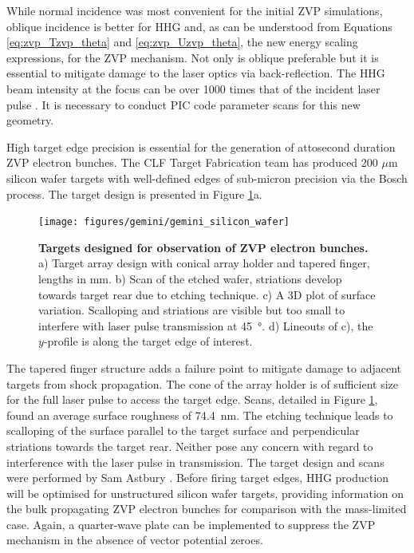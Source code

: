 While normal incidence was most convenient for the initial ZVP simulations, oblique incidence is better for \ac{HHG} \cite{gonoskovUltrarelativisticNanoplasmonicsRoute2011, edwardsXRayEmissionEffectiveness2020} and, as can be understood from Equations \ref{eq:zvp_Tzvp_theta} and \ref{eq:zvp_Uzvp_theta}, the new energy scaling expressions, for the ZVP mechanism. Not only is oblique preferable but it is essential to mitigate damage to the laser optics via back-reflection. The \ac{HHG} beam intensity at the focus can be over 1000 times that of the incident laser pulse \cite{quereReflectingPetawattLasers2021}. It is necessary to conduct PIC code parameter scans for this new geometry.

High target edge precision is essential for the generation of attosecond duration ZVP electron bunches. The CLF Target Fabrication team has produced 200 $\mu$m silicon wafer targets with well-defined edges of sub-micron precision via the Bosch process. The target design is presented in Figure \ref{fig:geminisiliconwafer}a.
\begin{figure}
	\centering
	\texttt{[image: figures/gemini/gemini\_silicon\_wafer]}
	\caption[Attosecond ZVP electron bunch targets]{\textbf{Targets designed for observation of ZVP electron bunches.} a) Target array design with conical array holder and tapered finger, lengths in mm. b) Scan of the etched wafer, striations develop towards target rear due to etching technique. c) A 3D plot of surface variation. Scalloping and striations are visible but too small to interfere with laser pulse transmission at \qty{45}{\degree}. d) Lineouts of c), the $y$-profile is along the target edge of interest.}
	\label{fig:geminisiliconwafer}
\end{figure}
The tapered finger structure adds a failure point to mitigate damage to adjacent targets from shock propagation. The cone of the array holder is of sufficient size for the full laser pulse to access the target edge. Scans, detailed in Figure \ref{fig:geminisiliconwafer}, found an average surface roughness of \qty{74.4}{nm}. The etching technique leads to scalloping of the surface parallel to the target surface and perpendicular striations towards the target rear. Neither pose any concern with regard to interference with the laser pulse in transmission. The target design and scans were performed by Sam Astbury \cite{astburyTargetFabricationGroup2024}. Before firing target edges, HHG production will be optimised for unstructured silicon wafer targets, providing information on the bulk propagating ZVP electron bunches for comparison with the mass-limited case. Again, a quarter-wave plate can be implemented to suppress the ZVP mechanism in the absence of vector potential zeroes.

